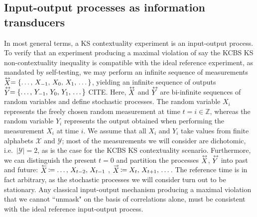 \subsection{Input-output processes as information transducers}
In most general terms, a KS contextuality experiment is an input-output process. To verify that an experiment producing a maximal violation of say the KCBS KS non-contextuality inequality is compatible with the ideal reference experiment, as mandated by self-testing, we may perform an infinite sequence of measurements  $\oset{\leftrightarrow}{X}=\{\dots,\thinspace X_{-1},\thinspace X_{0},\thinspace X_{1},\thinspace\dots\}$, yielding an infinite sequence of outputs $\oset{\leftrightarrow}{Y}=\{\dots,\thinspace Y_{-1},\thinspace Y_{0},\thinspace Y_{1},\thinspace \dots\}$ CITE. Here, $\oset{\leftrightarrow}{X}$ and $\oset{\leftrightarrow}{Y}$ are bi-infinite sequences of random variables and define stochastic processes. The random variable $X_{i}$ represents the freely chosen random measurement at time $t=i\in\mathbb{Z}$, whereas the random variable $Y_{i}$ represents the output obtained when performing the measurement $X_{i}$ at time $i$. We assume that all $X_i$ and $Y_i$ take values from finite alphabets $\mathcal{X}$ and $\mathcal{Y}$; most of the measurements we will consider are dichotomic, i.e.\ $\vert\mathcal{Y}\vert=2$, as is the case for the KCBS KS contextuality scenario. Furthermore, we can distinguish the present $t=0$ and partition the processes $\oset{\leftrightarrow}{X}$, $\oset{\leftrightarrow}{Y}$ into past and future: $\oset{\leftarrow}{X}\thinspace\coloneqq \dots,\thinspace X_{t-2},\thinspace X_{t-1}$ , $\oset{\rightarrow}{X}\thinspace\coloneqq X_t,\thinspace X_{t+1},\thinspace \dots$. The reference time is in fact arbitrary, as the stochastic processes we will consider turn out to be stationary. Any classical input-output mechanism producing a maximal violation that we cannot ``unmask" on the basis of correlations alone, must be consistent with the ideal reference input-output process.

